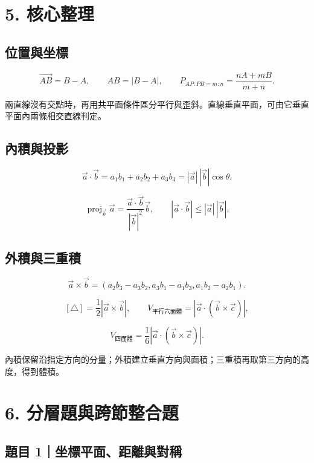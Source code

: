 \documentclass[11pt,a4paper]{article}
\begin{document}
\section{5. 核心整理}\label{ux6838ux5fc3ux6574ux7406}

\subsection{位置與坐標}\label{ux4f4dux7f6eux8207ux5750ux6a19}

\[
\overrightarrow{AB}=B-A,
\qquad
AB=|B-A|,
\qquad
P_{AP:PB=m:n}=\frac{nA+mB}{m+n}.
\]

兩直線沒有交點時，再用共平面條件區分平行與歪斜。直線垂直平面，可由它垂直平面內兩條相交直線判定。

\subsection{內積與投影}\label{ux5167ux7a4dux8207ux6295ux5f71}

\[
\vec a\cdot\vec b
=a_1b_1+a_2b_2+a_3b_3
=|\vec a|\,|\vec b|\cos\theta.
\]

\[
\operatorname{proj}_{\vec b}\vec a
=\frac{\vec a\cdot\vec b}{|\vec b|^2}\vec b,
\qquad
|\vec a\cdot\vec b|\le|\vec a|\,|\vec b|.
\]

\subsection{外積與三重積}\label{ux5916ux7a4dux8207ux4e09ux91cdux7a4d}

\[
\vec a\times\vec b
=
(a_2b_3-a_3b_2,
a_3b_1-a_1b_3,
a_1b_2-a_2b_1).
\]

\[
[\triangle]=\frac12|\vec a\times\vec b|,
\qquad
V_{\text{平行六面體}}
=|\vec a\cdot(\vec b\times\vec c)|,
\]

\[
V_{\text{四面體}}
=\frac16|\vec a\cdot(\vec b\times\vec c)|.
\]

內積保留沿指定方向的分量；外積建立垂直方向與面積；三重積再取第三方向的高度，得到體積。

\section{6. 分層題與跨節整合題}\label{ux5206ux5c64ux984cux8207ux8de8ux7bc0ux6574ux5408ux984c}

\subsection{題目 1｜坐標平面、距離與對稱}\label{ux984cux76ee-1ux5750ux6a19ux5e73ux9762ux8dddux96e2ux8207ux5c0dux7a31}
\end{document}
